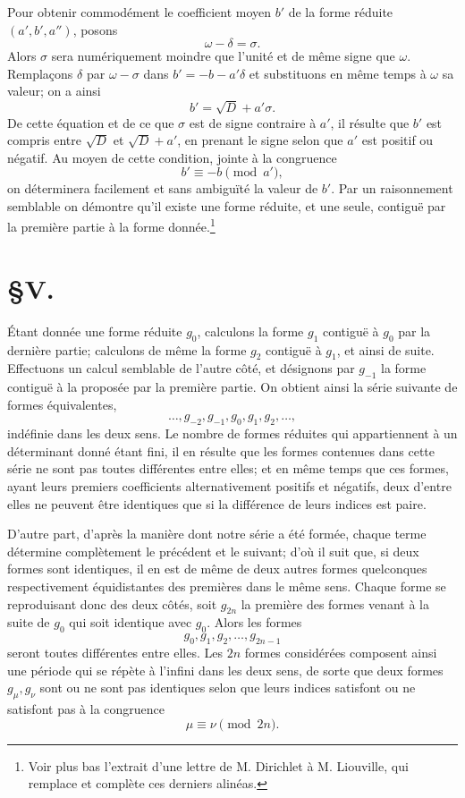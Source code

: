 \documentclass[11pt]{article}
\begin{document}
Pour obtenir commodément le coefficient moyen $b'$ de la forme réduite $(a',b',a'')$, posons
\[
  \omega-\delta=\sigma.
\]
Alors $\sigma$ sera numériquement moindre que l'unité et de même signe que $\omega$. Remplaçons $\delta$ par $\omega-\sigma$ dans $b'=-b-a'\delta$ et substituons en même temps à $\omega$ sa valeur; on a ainsi
\[
  b'=\sqrt D+a'\sigma.
\]
De cette équation et de ce que $\sigma$ est de signe contraire à $a'$, il résulte que $b'$ est compris entre $\sqrt D$ et $\sqrt D+a'$, en prenant le signe selon que $a'$ est positif ou négatif. Au moyen de cette condition, jointe à la congruence
\[
  b'\equiv-b\pmod {a'},
\]
on déterminera facilement et sans ambiguïté la valeur de $b'$. Par un raisonnement semblable on démontre qu'il existe une forme réduite, et une seule, contiguë par la première partie à la forme donnée.\footnote{Voir plus bas l'extrait d'une lettre de M. Dirichlet à M. Liouville, qui remplace et complète ces derniers alinéas.}

\section*{\S V.}

Étant donnée une forme réduite $g_0$, calculons la forme $g_1$ contiguë à $g_0$ par la dernière partie; calculons de même la forme $g_2$ contiguë à $g_1$, et ainsi de suite. Effectuons un calcul semblable de l'autre côté, et désignons par $g_{-1}$ la forme contiguë à la proposée par la première partie. On obtient ainsi la série suivante de formes équivalentes,
\[
  \ldots,g_{-2},g_{-1},g_0,g_1,g_2,\ldots,
\]
indéfinie dans les deux sens. Le nombre de formes réduites qui appartiennent à un déterminant donné étant fini, il en résulte que les formes contenues dans cette série ne sont pas toutes différentes entre elles; et en même temps que ces formes, ayant leurs premiers coefficients alternativement positifs et négatifs, deux d'entre elles ne peuvent être identiques que si la différence de leurs indices est paire.

D'autre part, d'après la manière dont notre série a été formée, chaque terme détermine complètement le précédent et le suivant; d'où il suit que, si deux formes sont identiques, il en est de même de deux autres formes quelconques respectivement équidistantes des premières dans le même sens. Chaque forme se reproduisant donc des deux côtés, soit $g_{2n}$ la première des formes venant à la suite de $g_0$ qui soit identique avec $g_0$. Alors les formes
\[
  g_0,g_1,g_2,\ldots,g_{2n-1}
\]
seront toutes différentes entre elles. Les $2n$ formes considérées composent ainsi une période qui se répète à l'infini dans les deux sens, de sorte que deux formes $g_\mu,g_\nu$ sont ou ne sont pas identiques selon que leurs indices satisfont ou ne satisfont pas à la congruence
\[
  \mu\equiv\nu\pmod {2n}.
\]
\end{document}
